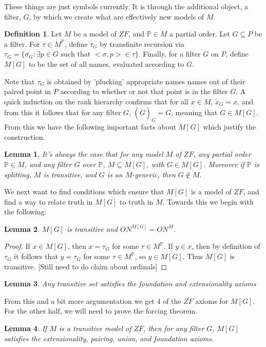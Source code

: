 \documentclass{article}
\theoremstyle{definition}
\newtheorem{definition}{Definition}[section]
\theoremstyle{plain}
\theoremstyle{theorem}
\newtheorem{lemma}{Lemma}[section]
\begin{document}
These things are just symbols currently. It is through the additional object, a filter, $G$, by which we create what are effectively new models of $M$.
\begin{definition}
	Let $M$ be a model of $ZF$, and $\mathbb{P} \in M$ a partial order. Let $G \subseteq P$ be a filter. For $\tau \in M^{\mathbb{P}}$, define $\tau_G$ by transfinite recursion via $\tau_G = \{\sigma_G: \exists p \in G \textrm{ such that }<\sigma,p> \in \tau\}$. Finally, for a filter $G$ on $P$, define $M[G]$ to be the set of all names, evaluated according to $G$.
\end{definition}
Note that $\tau_{G}$ is obtained by 'plucking' appropriate names names out of their paired point in $P$ according to whether or not that point is in the filter $G$. A quick induction on the rank hierarchy confirms that for all $x \in M$, $\check{x}_G = x$, and from this it follows that for any filter $G$, $(\dot{G})_G = G$, meaning that $G \in M[G]$. From this we have the following important facts about $M[G]$ which justify the construction.
\begin{lemma}
	It's always the case that for any model $M$ of $ZF$, any partial order $\mathbb{P} \in M$, and any filter $G$ over $\mathbb{P}$, $M \subseteq M[G]$, with $G \in M[G]$. Moreover if $\mathbb{P}$ is splitting, $M$ is transitive, and $G$ is an $M$-generic, then $G \notin M$.
\end{lemma}
We next want to find conditions which ensure that $M[G]$ is a model of $ZF$, and find a way to relate truth in $M[G]$ to truth in $M$. Towards this we begin with the following:
\begin{lemma}
	$M[G]$ is transitive and $ON^{M[G]} = ON^{M}$.
\end{lemma}
\begin{proof}
	If $x \in M[G]$, then $x = \tau_G$ for some $\tau \in M^{\mathbb{P}}$. If $y \in x$, then by definition of $\tau_G$ it follows that $y = \tau_G$ for some $\tau \in M^{\mathbb{P}}$, so $y \in M[G]$. Thus $M[G]$ is transitive. [Still need to do claim about ordinals]
\end{proof}
\begin{lemma}
	Any transitive set satisfies the foundation and extensionality axioms
\end{lemma}
From this and a bit more argumentation we get $4$ of the $ZF$ axioms for $M[G]$. For the other half, we will need to prove the forcing theorem.
\begin{lemma}
	If $M$ is a transitive model of $ZF$, then for any filter $G$, $M[G]$ satisfies the extensionality, pairing, union, and foundation axioms.
\end{lemma}
\end{document}
